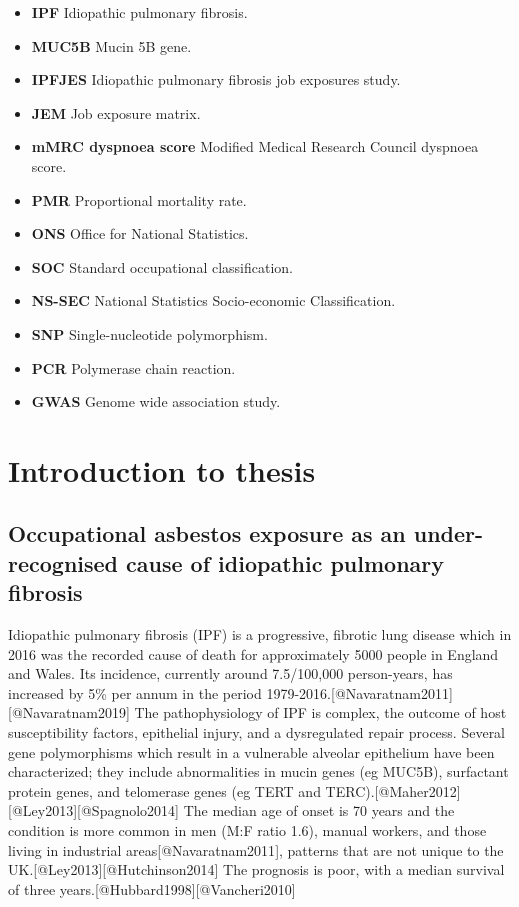 \documentclass[
]{article}
\providecommand{\tightlist}{%
  \setlength{\itemsep}{0pt}\setlength{\parskip}{0pt}}
\begin{document}
\begin{itemize}
\tightlist
\item
  \textbf{IPF} Idiopathic pulmonary fibrosis.
\item
  \textbf{MUC5B} Mucin 5B gene.
\item
  \textbf{IPFJES} Idiopathic pulmonary fibrosis job exposures study.
\item
  \textbf{JEM} Job exposure matrix.
\item
  \textbf{mMRC dyspnoea score} Modified Medical Research Council
  dyspnoea score.
\item
  \textbf{PMR} Proportional mortality rate.
\item
  \textbf{ONS} Office for National Statistics.
\item
  \textbf{SOC} Standard occupational classification.
\item
  \textbf{NS-SEC} National Statistics Socio-economic Classification.
\item
  \textbf{SNP} Single-nucleotide polymorphism.
\item
  \textbf{PCR} Polymerase chain reaction.
\item
  \textbf{GWAS} Genome wide association study.
\end{itemize}

\newpage

\hypertarget{introduction-to-thesis}{%
\section{Introduction to thesis}\label{introduction-to-thesis}}

\hypertarget{occupational-asbestos-exposure-as-an-under-recognised-cause-of-idiopathic-pulmonary-fibrosis}{%
\subsection{Occupational asbestos exposure as an under-recognised cause
of idiopathic pulmonary
fibrosis}\label{occupational-asbestos-exposure-as-an-under-recognised-cause-of-idiopathic-pulmonary-fibrosis}}

Idiopathic pulmonary fibrosis (IPF) is a progressive, fibrotic lung
disease which in 2016 was the recorded cause of death for approximately
5000 people in England and Wales. Its incidence, currently around
7.5/100,000 person-years, has increased by 5\% per annum in the period
1979-2016.{[}@Navaratnam2011{]}{[}@Navaratnam2019{]} The pathophysiology
of IPF is complex, the outcome of host susceptibility factors,
epithelial injury, and a dysregulated repair process. Several gene
polymorphisms which result in a vulnerable alveolar epithelium have been
characterized; they include abnormalities in mucin genes (eg MUC5B),
surfactant protein genes, and telomerase genes (eg TERT and
TERC).{[}@Maher2012{]}{[}@Ley2013{]}{[}@Spagnolo2014{]} The median age
of onset is 70 years and the condition is more common in men (M:F ratio
1.6), manual workers, and those living in industrial
areas{[}@Navaratnam2011{]}, patterns that are not unique to the
UK.{[}@Ley2013{]}{[}@Hutchinson2014{]} The prognosis is poor, with a
median survival of three years.{[}@Hubbard1998{]}{[}@Vancheri2010{]}
\end{document}
